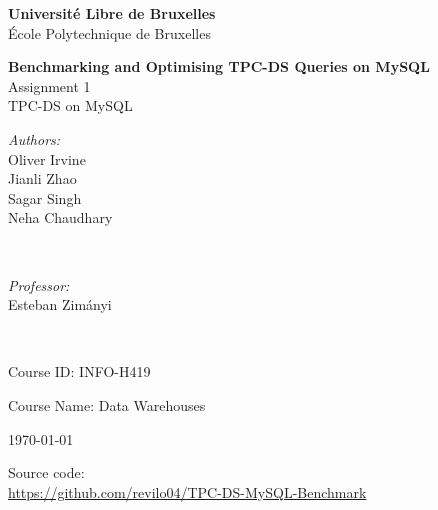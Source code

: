 \documentclass{ULBreport}
\begin{document}
\begin{titlepage}

  \centering
  \vspace*{1cm}

{\large \bfseries Université Libre de Bruxelles}\\[0.2cm] 
{\large École Polytechnique de Bruxelles}\\[1cm] 
\vspace*{1cm}

  { \huge \bfseries Benchmarking and Optimising TPC-DS Queries on MySQL
  }\\[0.4cm]
  \vspace{1cm}
  {\Large Assignment 1\\[0.2cm] TPC-DS on MySQL }\\[0.4cm] 


 

\vspace*{2cm}
\begin{minipage}{0.45\textwidth}
\begin{flushleft} \large
\emph{Authors:}\\ [0.5em]
Oliver Irvine\\ 
Jianli Zhao\\ 
Sagar Singh\\ 
Neha Chaudhary\\
\end{flushleft}
\end{minipage}
~
\begin{minipage}{0.45\textwidth}
\begin{flushright} \large
\emph{Professor:} \\ [0.5em]
Esteban Zimányi
\end{flushright}
\end{minipage}\\[2cm]
\makeatother

   
  {\large Course ID: INFO-H419\par}
  {\large Course Name: Data Warehouses\par}
  \vspace{0.5cm}
 {\large \today\par}

  \vfill
  {\large Source code:\\[4pt]
  \url{https://github.com/revilo04/TPC-DS-MySQL-Benchmark}\par}
  \vspace{1cm}
\end{titlepage}

\tableofcontents
\clearpage
\end{document}
